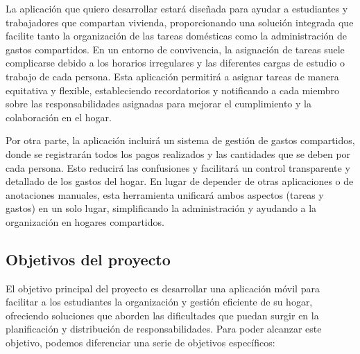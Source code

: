 \documentclass{article}
\begin{document}
La aplicación que quiero desarrollar estará diseñada para ayudar a estudiantes y trabajadores que compartan vivienda,
proporcionando una solución integrada que facilite tanto la organización de las tareas domésticas como la administración de gastos compartidos.
En un entorno de convivencia, la asignación de tareas suele complicarse debido a los horarios irregulares y las diferentes cargas de estudio o trabajo de cada persona.
Esta aplicación permitirá a asignar tareas de manera equitativa y flexible, estableciendo recordatorios y notificando a cada miembro sobre las responsabilidades
asignadas para mejorar el cumplimiento y la colaboración en el hogar. 

Por otra parte, la aplicación incluirá un sistema de gestión de gastos compartidos, donde se registrarán todos los pagos realizados
y las cantidades que se deben por cada persona. Esto reducirá las confusiones y facilitará un control transparente y detallado de los 
gastos del hogar. En lugar de depender de otras aplicaciones o de anotaciones manuales, esta herramienta unificará ambos aspectos (tareas y gastos) 
en un solo lugar, simplificando la administración y ayudando a la organización en hogares compartidos.


\subsection{Objetivos del proyecto}

El objetivo principal del proyecto es desarrollar una aplicación móvil para facilitar a los estudiantes la organización y gestión eficiente de su hogar, ofreciendo soluciones que aborden las dificultades 
que puedan surgir en la planificación y distribución de responsabilidades. Para poder alcanzar este objetivo, podemos diferenciar una serie de objetivos específicos:
\end{document}
